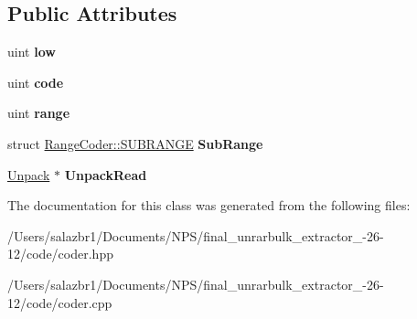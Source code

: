 \subsection*{Public Attributes}
\begin{DoxyCompactItemize}
\item 
\hypertarget{class_range_coder_a3f6ba080220420872ee8a0a23c8b9e60}{uint {\bfseries low}}\label{class_range_coder_a3f6ba080220420872ee8a0a23c8b9e60}

\item 
\hypertarget{class_range_coder_a95c38ce19d2a8e6aa65da33907dda1a4}{uint {\bfseries code}}\label{class_range_coder_a95c38ce19d2a8e6aa65da33907dda1a4}

\item 
\hypertarget{class_range_coder_aca1c148cb14ff7bc7fc4b6a3fe9760e5}{uint {\bfseries range}}\label{class_range_coder_aca1c148cb14ff7bc7fc4b6a3fe9760e5}

\item 
\hypertarget{class_range_coder_a81db5eab092dcb34ab3204e0d85cdecc}{struct \hyperlink{struct_range_coder_1_1_s_u_b_r_a_n_g_e}{Range\-Coder\-::\-S\-U\-B\-R\-A\-N\-G\-E} {\bfseries Sub\-Range}}\label{class_range_coder_a81db5eab092dcb34ab3204e0d85cdecc}

\item 
\hypertarget{class_range_coder_ac79539170d5b5d812ce88d5e18b36a76}{\hyperlink{class_unpack}{Unpack} $\ast$ {\bfseries Unpack\-Read}}\label{class_range_coder_ac79539170d5b5d812ce88d5e18b36a76}

\end{DoxyCompactItemize}


The documentation for this class was generated from the following files\-:\begin{DoxyCompactItemize}
\item 
/\-Users/salazbr1/\-Documents/\-N\-P\-S/final\-\_\-unrarbulk\-\_\-extractor\-\_-\/26-\/12/code/coder.\-hpp\item 
/\-Users/salazbr1/\-Documents/\-N\-P\-S/final\-\_\-unrarbulk\-\_\-extractor\-\_-\/26-\/12/code/coder.\-cpp\end{DoxyCompactItemize}
